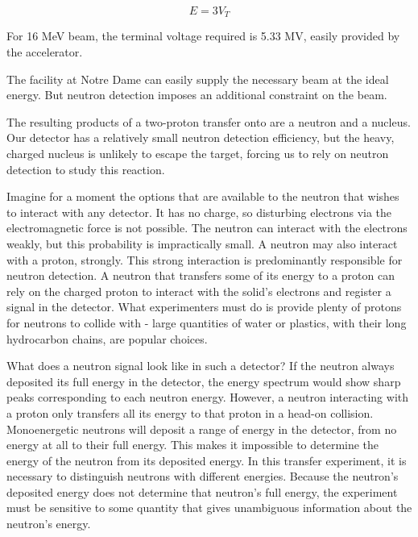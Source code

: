 \begin{equation}
E = 3V_T
\end{equation}

For 16 MeV  beam, the terminal voltage required is 5.33 MV, easily provided by the accelerator.

The facility at Notre Dame can easily supply the necessary beam at the ideal energy.  But neutron detection imposes an additional constraint on the beam.

The resulting products of a two-proton transfer onto  are a neutron and a  nucleus.  Our detector has a relatively small neutron detection efficiency, but the heavy, charged  nucleus is unlikely to escape the target, forcing us to rely on neutron detection to study this reaction.  

Imagine for a moment the options that are available to the neutron that wishes to interact with any detector.  It has no charge, so disturbing electrons via the electromagnetic force is not possible.  The neutron can interact with the electrons weakly, but this probability is impractically small.  A neutron may also interact with a proton, strongly.  This strong interaction is predominantly responsible for neutron detection.  A neutron that transfers some of its energy to a proton can rely on the charged proton to interact with the solid's electrons and register a signal in the detector.  What experimenters must do is provide plenty of protons for neutrons to collide with - large quantities of water or plastics, with their long hydrocarbon chains, are popular choices.

What does a neutron signal look like in such a detector?  If the neutron always deposited its full energy in the detector, the energy spectrum would show sharp peaks corresponding to each neutron energy.  However, a neutron interacting with a proton only transfers all its energy to that proton in a head-on collision.  Monoenergetic neutrons will deposit a range of energy in the detector, from no energy at all to their full energy.  This makes it impossible to determine the energy of the neutron from its deposited energy.  In this transfer experiment, it is necessary to distinguish neutrons with different energies.  Because the neutron's deposited energy does not determine that neutron's full energy, the experiment must be sensitive to some quantity that gives unambiguous information about the neutron's energy.


